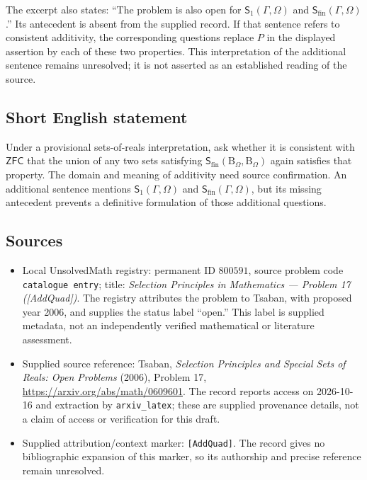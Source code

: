 \documentclass[11pt]{article}
\begin{document}
The excerpt also states: ``The problem is also open for \(\mathsf{S}_1(\Gamma,\Omega)\) and \(\mathsf{S}_{\mathrm{fin}}(\Gamma,\Omega)\).'' Its antecedent is absent from the supplied record. If that sentence refers to consistent additivity, the corresponding questions replace \(P\) in the displayed assertion by each of these two properties. This interpretation of the additional sentence remains unresolved; it is not asserted as an established reading of the source.
\subsection{Short English statement}
Under a provisional sets-of-reals interpretation, ask whether it is consistent with \(\mathsf{ZFC}\) that the union of any two sets satisfying \(\mathsf{S}_{\mathrm{fin}}(\mathrm{B}_\Omega,\mathrm{B}_\Omega)\) again satisfies that property. The domain and meaning of additivity need source confirmation. An additional sentence mentions \(\mathsf{S}_1(\Gamma,\Omega)\) and \(\mathsf{S}_{\mathrm{fin}}(\Gamma,\Omega)\), but its missing antecedent prevents a definitive formulation of those additional questions.
\subsection{Sources}
\begin{itemize}
\item Local UnsolvedMath registry: permanent ID \(800591\), source problem code \texttt{catalogue entry}; title: \emph{Selection Principles in Mathematics --- Problem 17 ([AddQuad])}. The registry attributes the problem to Tsaban, with proposed year 2006, and supplies the status label ``open.'' This label is supplied metadata, not an independently verified mathematical or literature assessment.
\item Supplied source reference: Tsaban, \emph{Selection Principles and Special Sets of Reals: Open Problems} (2006), Problem 17, \url{https://arxiv.org/abs/math/0609601}. The record reports access on 2026-10-16 and extraction by \texttt{arxiv\_latex}; these are supplied provenance details, not a claim of access or verification for this draft.
\item Supplied attribution/context marker: \texttt{[AddQuad]}. The record gives no bibliographic expansion of this marker, so its authorship and precise reference remain unresolved.
\end{itemize}
\end{document}
